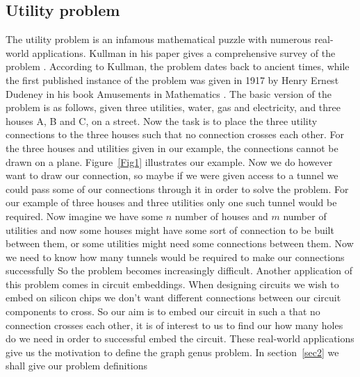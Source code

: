 \documentclass{article}
\begin{document}
    \subsection{Utility problem}
    The utility problem is an infamous mathematical puzzle with numerous real-world applications. Kullman in his paper gives a comprehensive survey of the problem \cite{Kullman79}.
    According to Kullman, the problem dates back to ancient times, while the first published instance of the problem was given in 1917 by Henry Ernest Dudeney in his book Amusements in Mathematics \cite{Dudeney17, Kullman79}.
    The basic version of the problem is as follows, given three utilities, water, gas and electricity, and three houses A, B and C, on a street. 
    Now the task is to place the three utility connections to the three houses such that no connection crosses each other. For the three houses and utilities given in our example, the connections cannot be drawn on a plane.
    Figure~\ref*{Fig1} illustrates our example. Now we do however want to draw our connection, so maybe if we were given access to a tunnel we could pass some of our connections through it in order to solve the problem.
    For our example of three houses and three utilities only one such tunnel would be required. Now imagine we have some $n$ number of houses and $m$ number of utilities and now some houses might have some sort of connection to be built between them, or some utilities might need some connections between them.
    Now we need to know how many tunnels would be required to make our connections successfully
    So the problem becomes increasingly difficult. Another application of this problem comes in circuit embeddings. 
    When designing circuits we wish to embed on silicon chips we don't want different connections between our circuit components to cross. So our aim is to embed our circuit in such a that no connection crosses each other, it is of interest to us to find our how many holes do we need in order to successful embed the circuit.
    These real-world applications give us the motivation to define the graph genus problem. In section~\ref*{sec2} we shall give our problem definitions
    
\end{document}
